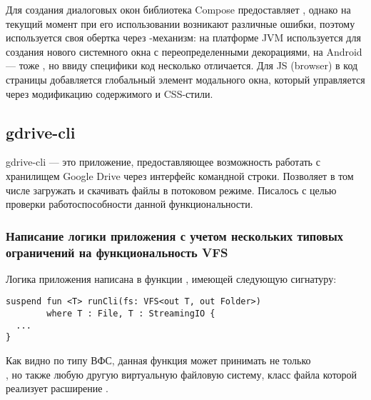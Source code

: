     Для создания диалоговых окон библиотека Compose предоставляет , однако на текущий момент при его использовании возникают различные ошибки\cite{gh-compose-alert-dialog,gh-compose-alert-dialog-2}, поэтому используется своя обертка через -механизм: на платформе JVM используется  для создания нового системного окна с переопределенными декорациями, на Android --- тоже , но ввиду специфики код несколько отличается. Для JS (browser) в код страницы добавляется глобальный элемент модального окна, который управляется через модификацию содержимого и CSS-стили.

\subsection{gdrive-cli}
  gdrive-cli\cite{gh-gdrive-cli} --- это приложение, предоставляющее возможность работать с хранилищем Google Drive через интерфейс командной строки. Позволяет в том числе загружать и скачивать файлы в потоковом режиме. Писалось с целью проверки работоспособности данной функциональности.

  \subsubsection{Написание логики приложения с учетом нескольких типовых ограничений на функциональность VFS}
    Логика приложения написана в функции , имеющей следующую сигнатуру:
    \begin{verbatim}
suspend fun <T> runCli(fs: VFS<out T, out Folder>)
        where T : File, T : StreamingIO {
  ...
}
    \end{verbatim}
    Как видно по типу ВФС, данная функция может принимать не только\\ , но также любую другую виртуальную файловую систему, класс файла которой реализует расширение .

